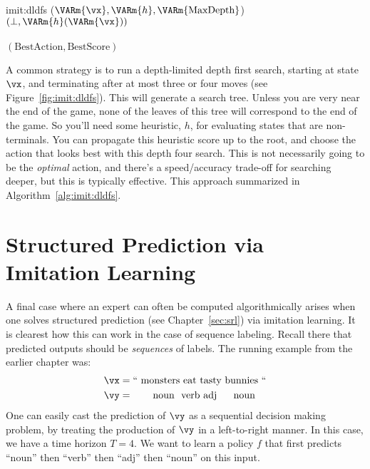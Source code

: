 \newalgorithm%
  {imit:dldfs}%
  {($\VARm{\vx}, \VARm{h}, \VARm{\text{MaxDepth}}$)}
  {
      \RETURN $(\bot, \VARm{h}(\VARm{\vx}))$
      \\
    \ELSE
        \\
        \ENDIF
      \ENDFOR
    \ENDIF
    \RETURN $(\text{BestAction}, \text{BestScore})$
  }


A common strategy is to run a depth-limited depth first search, starting at state $\vx$, and terminating after at most three or four moves (see Figure~\ref{fig:imit:dldfs}).
This will generate a search tree.
Unless you are very near the end of the game, none of the leaves of this tree will correspond to the end of the game.
So you'll need some heuristic, $h$, for evaluating states that are non-terminals.
You can propagate this heuristic score up to the root, and choose the action that looks best with this depth four search.
This is not necessarily going to be the \emph{optimal} action, and there's a speed/accuracy trade-off for searching deeper, but this is typically effective.
This approach summarized in Algorithm~\ref{alg:imit:dldfs}.


\section{Structured Prediction via Imitation Learning}

A final case where an expert can often be computed algorithmically arises when one solves structured prediction (see Chapter~\ref{sec:srl}) via imitation learning.
It is clearest how this can work in the case of sequence labeling.
Recall there that predicted outputs should be \emph{sequences} of labels.
The running example from the earlier chapter was:
%
\begin{align}
  \vx &= \text{`` monsters eat tasty bunnies ``} \\
  \vy &= \text{~~~~~~noun~~verb~adj~~~~~noun}
\end{align}
%
One can easily cast the prediction of $\vy$ as a sequential decision making problem, by treating the production of $\vy$ in a left-to-right manner.
In this case, we have a time horizon $T=4$.
We want to learn a policy $f$ that first predicts ``noun'' then ``verb'' then ``adj'' then ``noun'' on this input.

